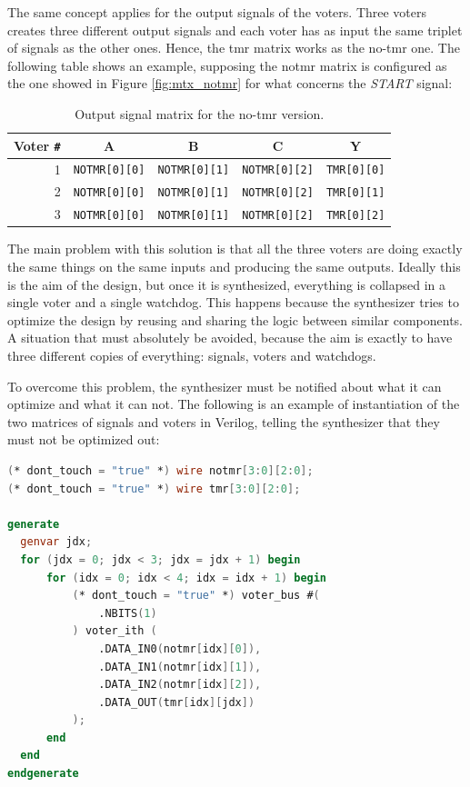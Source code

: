 The same concept applies for the output signals of the voters. Three voters creates three different output signals and each voter has as input the same triplet of signals as the other ones. Hence, the tmr matrix works as the no-tmr one. The following table shows an example, supposing the notmr matrix is configured as the one showed in Figure \ref{fig:mtx_notmr} for what concerns the \textit{START} signal:

\begin{table}[H]
\centering
\begin{tabular}{ r|ccc|c }
    \textbf{Voter \texttt{\#}}&\textbf{A}&\textbf{B}&\textbf{C}&\textbf{Y}\\
    \hline
    1 & \texttt{NOTMR[0][0]} & \texttt{NOTMR[0][1]} & \texttt{NOTMR[0][2]} & \texttt{TMR[0][0]}\\
    2 & \texttt{NOTMR[0][0]} & \texttt{NOTMR[0][1]} & \texttt{NOTMR[0][2]} & \texttt{TMR[0][1]}\\
    3 & \texttt{NOTMR[0][0]} & \texttt{NOTMR[0][1]} & \texttt{NOTMR[0][2]} & \texttt{TMR[0][2]}\\
\end{tabular}
\caption{Output signal matrix for the no-tmr version.}
\end{table}

The main problem with this solution is that all the three voters are doing exactly the same things on the same inputs and producing the same outputs. Ideally this is the aim of the design, but once it is synthesized, everything is collapsed in a single voter and a single watchdog. This happens because the synthesizer tries to optimize the design by reusing and sharing the logic between similar components. A situation that must absolutely be avoided, because the aim is exactly to have three different copies of everything: signals, voters and watchdogs.\bigskip

To overcome this problem, the synthesizer must be notified about what it can optimize and what it can not. The following is an example of instantiation of the two matrices of signals and voters in Verilog, telling the synthesizer that they must not be optimized out:

\begin{lstlisting}[language=Verilog]
(* dont_touch = "true" *) wire notmr[3:0][2:0];
(* dont_touch = "true" *) wire tmr[3:0][2:0];

generate
  genvar jdx;
  for (jdx = 0; jdx < 3; jdx = jdx + 1) begin
      for (idx = 0; idx < 4; idx = idx + 1) begin
          (* dont_touch = "true" *) voter_bus #(
              .NBITS(1)
          ) voter_ith (
              .DATA_IN0(notmr[idx][0]),
              .DATA_IN1(notmr[idx][1]),
              .DATA_IN2(notmr[idx][2]),
              .DATA_OUT(tmr[idx][jdx])
          );
      end
  end
endgenerate
\end{lstlisting}

